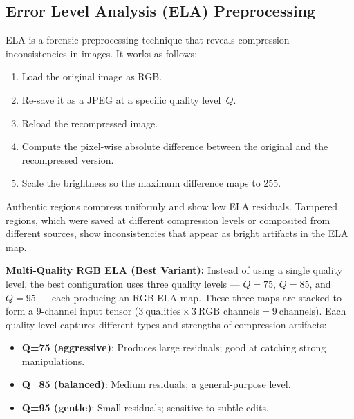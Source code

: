 \documentclass[conference]{IEEEtran}
\begin{document}
\subsection{Error Level Analysis (ELA) Preprocessing}

ELA is a forensic preprocessing technique that reveals compression inconsistencies in images. It works as follows:

\begin{enumerate}
    \item Load the original image as RGB.
    \item Re-save it as a JPEG at a specific quality level~$Q$.
    \item Reload the recompressed image.
    \item Compute the pixel-wise absolute difference between the original and the recompressed version.
    \item Scale the brightness so the maximum difference maps to 255.
\end{enumerate}

Authentic regions compress uniformly and show low ELA residuals. Tampered regions, which were saved at different compression levels or composited from different sources, show inconsistencies that appear as bright artifacts in the ELA map.

\textbf{Multi-Quality RGB ELA (Best Variant):} Instead of using a single quality level, the best configuration uses three quality levels --- $Q=75$, $Q=85$, and $Q=95$ --- each producing an RGB ELA map. These three maps are stacked to form a 9-channel input tensor ($3~\text{qualities} \times 3~\text{RGB channels} = 9~\text{channels}$). Each quality level captures different types and strengths of compression artifacts:

\begin{itemize}
    \item \textbf{Q=75 (aggressive)}: Produces large residuals; good at catching strong manipulations.
    \item \textbf{Q=85 (balanced)}: Medium residuals; a general-purpose level.
    \item \textbf{Q=95 (gentle)}: Small residuals; sensitive to subtle edits.
\end{itemize}
\end{document}
